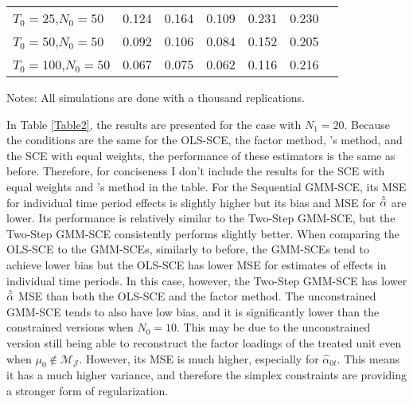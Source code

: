 \documentclass{article}
\begin{document}
\begin{table}[t]
{\begin{threeparttable}
\begin{tabular}{l c*{5}{c}}
$T_0 = 25$,$N_0 = 50$  & 0.124 & 0.164 & 0.109 &  0.231 & 0.230\\
$T_0 = 50$,$N_0 = 50$ & 0.092 & 0.106 & 0.084 & 0.152 & 0.205\\
$T_0 = 100$,$N_0 = 50$ & 0.067 & 0.075 & 0.062 & 0.116 & 0.216\\


\hline
\end{tabular}
\begin{tablenotes}
      \small
      \item Notes: All simulations are done with a thousand replications.
\end{tablenotes}
    \end{threeparttable}}
\end{table}

In Table \ref{Table2}, the results are presented for the case with $N_1 = 20$. Because the conditions are the same for the OLS-SCE, the factor method, \cite{Powell2021}'s method, and the SCE with equal weights, the performance of these estimators is the same as before. Therefore, for conciseness I don't include the results for the SCE with equal weights and \cite{Powell2021}'s method in the table. For the Sequential GMM-SCE, its MSE for individual time period effects is slightly higher but its bias and MSE for $\hat{\Bar{\alpha}}$ are lower. Its performance is relatively similar to the Two-Step GMM-SCE, but the Two-Step GMM-SCE consistently performs slightly better. When comparing the OLS-SCE to the GMM-SCEs, similarly to before, the GMM-SCEs tend to achieve lower bias but the OLS-SCE has lower MSE for estimates of effects in individual time periods. In this case, however, the Two-Step GMM-SCE has lower $\hat{\Bar{\alpha}}$ MSE than both the OLS-SCE and the factor method. The unconstrained GMM-SCE tends to also have low bias, and it is significantly lower than the constrained versions when $N_0 = 10$. This may be due to the unconstrained version still being able to reconstruct the factor loadings of the treated unit even when $\mu_0 \notin \mathcal{M}_{\mathcal{J}}$. However, its MSE is much higher, especially for $\hat{\alpha}_{0t}$. This means it has a much higher variance, and therefore the simplex constraints are providing a stronger form of regularization. 
\par 
\end{document}

